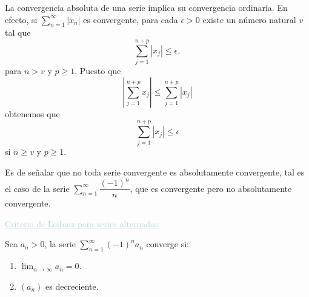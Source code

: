 \documentclass[12pt]{article}
\begin{document}
La convergencia absoluta de una serie implica su convergencia ordinaria. En efecto, si $\sum_{n=1}^{\infty}|x_n|$ es convergente, para cada $\epsilon>0$ existe un número natural $v$ tal que \[ \sum_{j=1}^{n+p} |x_j|\le\epsilon,\] para $n>v$ y $p\ge1$. Puesto que \[ \left|\sum_{j=1}^{n+p} x_j\right| \le\sum_{j=1}^{n+p} |x_j|\] obtenemos que \[ \sum_{j=1}^{n+p} |x_j|\le\epsilon \] si $n\ge v$ y $p\ge1$.

Es de señalar que no toda serie convergente es absolutamente convergente, tal es el caso de la serie $\sum_{n=1}^{\infty}\dfrac{(-1)^n}{n}$, que es convergente pero no absolutamente convergente.

\textcolor{lightblue}{\underline{Criterio de Leibniz para series alternadas}}

Sea $a_n>0$, la serie $\sum_{n=1}^{\infty}(-1)^na_n$ converge si:
\begin{enumerate}[label=\arabic*)]
	\item $\lim_{n\to\infty}a_n=0$.
	\item $(a_n)$ es decreciente.
\end{enumerate}

\newpage



\newpage



\newpage


\end{document}
